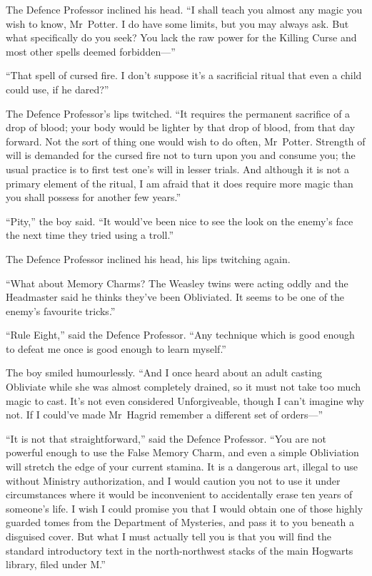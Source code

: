 The Defence Professor inclined his head. “I shall teach you almost any magic you wish to know, Mr~Potter. I do have some limits, but you may always ask. But what specifically do you seek? You lack the raw power for the Killing Curse and most other spells deemed forbidden—”

“That spell of cursed fire. I don’t suppose it’s a sacrificial ritual that even a child could use, if he dared?”

The Defence Professor’s lips twitched. “It requires the permanent sacrifice of a drop of blood; your body would be lighter by that drop of blood, from that day forward. Not the sort of thing one would wish to do often, Mr~Potter. Strength of will is demanded for the cursed fire not to turn upon you and consume you; the usual practice is to first test one’s will in lesser trials. And although it is not a primary element of the ritual, I am afraid that it does require more magic than you shall possess for another few years.”

“Pity,” the boy said. “It would’ve been nice to see the look on the enemy’s face the next time they tried using a troll.”

The Defence Professor inclined his head, his lips twitching again.

“What about Memory Charms? The Weasley twins were acting oddly and the Headmaster said he thinks they’ve been Obliviated. It seems to be one of the enemy’s favourite tricks.”

“Rule Eight,” said the Defence Professor. “Any technique which is good enough to defeat me once is good enough to learn myself.”

The boy smiled humourlessly. “And I once heard about an adult casting Obliviate while she was almost completely drained, so it must not take too much magic to cast. It’s not even considered Unforgiveable, though I can’t imagine why not. If I could’ve made Mr~Hagrid remember a different set of orders—”

“It is not that straightforward,” said the Defence Professor. “You are not powerful enough to use the False Memory Charm, and even a simple Obliviation will stretch the edge of your current stamina. It is a dangerous art, illegal to use without Ministry authorization, and I would caution you not to use it under circumstances where it would be inconvenient to accidentally erase ten years of someone’s life. I wish I could promise you that I would obtain one of those highly guarded tomes from the Department of Mysteries, and pass it to you beneath a disguised cover. But what I must actually tell you is that you will find the standard introductory text in the north-northwest stacks of the main Hogwarts library, filed under M.”


